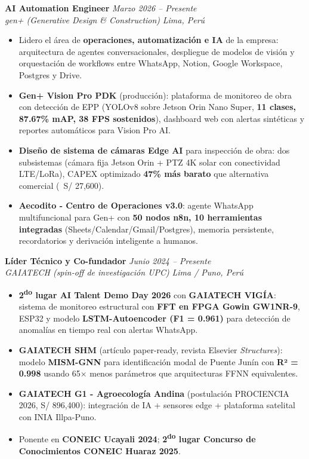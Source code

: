 \documentclass[10pt, a4paper]{article}
\newcommand{\entry}[4]{
    \textbf{#1} \hfill \textit{#2} \\
    \textit{#3} \hfill \textit{#4} \\
    \vspace{-1.5mm}
}
\begin{document}
\entry{AI Automation Engineer}{Marzo 2026 -- Presente}{gen+ (Generative Design \& Construction)}{Lima, Perú}
\begin{itemize}
    \item Lidero el área de \textbf{operaciones, automatización e IA} de la empresa: arquitectura de agentes conversacionales, despliegue de modelos de visión y orquestación de workflows entre WhatsApp, Notion, Google Workspace, Postgres y Drive.
    \item \textbf{Gen+ Vision Pro PDK} (producción): plataforma de monitoreo de obra con detección de EPP (YOLOv8 sobre Jetson Orin Nano Super, \textbf{11 clases, 87.67\% mAP, 38 FPS sostenidos}), dashboard web con alertas sintéticas y reportes automáticos para Vision Pro AI.
    \item \textbf{Diseño de sistema de cámaras Edge AI} para inspección de obra: dos subsistemas (cámara fija Jetson Orin + PTZ 4K solar con conectividad LTE/LoRa), CAPEX optimizado \textbf{47\% más barato} que alternativa comercial (~S/ 27,600).
    \item \textbf{Aecodito - Centro de Operaciones v3.0}: agente WhatsApp multifuncional para Gen+ con \textbf{50 nodos n8n, 10 herramientas integradas} (Sheets/Calendar/Gmail/Postgres), memoria persistente, recordatorios y derivación inteligente a humanos.
\end{itemize}

\vspace{1mm}

\entry{Líder Técnico y Co-fundador}{Junio 2024 -- Presente}{GAIATECH (spin-off de investigación UPC)}{Lima / Puno, Perú}
\begin{itemize}
    \item \textbf{2\textsuperscript{do} lugar AI Talent Demo Day 2026} con \textbf{GAIATECH VIGÍA}: sistema de monitoreo estructural con \textbf{FFT en FPGA Gowin GW1NR-9}, ESP32 y modelo \textbf{LSTM-Autoencoder (F1 = 0.961)} para detección de anomalías en tiempo real con alertas WhatsApp.
    \item \textbf{GAIATECH SHM} (artículo paper-ready, revista Elsevier \textit{Structures}): modelo \textbf{MISM-GNN} para identificación modal de Puente Junín con \textbf{R² = 0.998} usando 65× menos parámetros que arquitecturas FFNN equivalentes.
    \item \textbf{GAIATECH G1 - Agroecología Andina} (postulación PROCIENCIA 2026, S/ 896,400): integración de IA + sensores edge + plataforma satelital con INIA Illpa-Puno.
    \item Ponente en \textbf{CONEIC Ucayali 2024}; \textbf{2\textsuperscript{do} lugar Concurso de Conocimientos CONEIC Huaraz 2025}.
\end{itemize}
\end{document}
